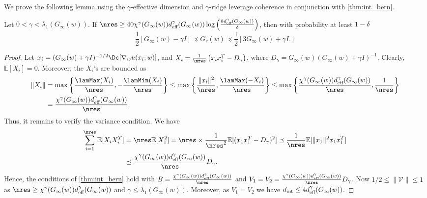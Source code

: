 We prove the following lemma using the $\gamma$-effective dimension and $\gamma$-ridge leverage coherence in conjunction with \cref{thm:int_bern}.
\begin{lemma}
\label{lemma:sampling}
Let $0<\gamma<\lambda_1(G_{\infty}(w))$. 
If $\nres\geq 40\chi^\gamma(G_{\infty}(w))d^{\gamma}_{\textup{eff}}(G_{\infty}(w))\log\left(\frac{8d^{\gamma}_{\textup{eff}}(G_{\infty}(w))}{\delta}\right)$, then with probability at least $1-\delta$
    \[
    \frac{1}{2}\left[G_\infty(w)-\gamma I\right] \preceq G_{r}(w)\preceq \frac{1}{2}\left[3 G_\infty(w)+\gamma I.\right]
    \]
\end{lemma}
\begin{proof}
    Let $x_i = (G_{\infty}(w)+\gamma I)^{-1/2}\Dc[\nabla_w u(x_i;w)]$, and $X_i = \frac{1}{\nres}\left(x_ix_i^{T}-D_\gamma\right)$, where $D_\gamma = G_{\infty}(w)\left(G_{\infty}(w)+\gamma I\right)^{-1}$.
    Clearly, $\mathbb E[X_i] = 0$. 
    Moreover, the $X_i$'s are bounded as
    \begin{align*}
    \|X_i\| & = \max\left\{\frac{\lamMax(X_i)}{\nres},-\frac{\lamMin(X_i)}{\nres}\right\} \leq \max\left\{\frac{\|x_i\|^2}{\nres}, \frac{\lamMax(-X_i)}{\nres}\right\} \leq \max\left\{\frac{\chi^{\gamma}(G_{\infty}(w))d^{\gamma}_{\textup{eff}}(G_{\infty}(w))}{\nres},\frac{1}{\nres}\right\} \\
    & = \frac{\chi^{\gamma}(G_{\infty}(w))d^{\gamma}_{\textup{eff}}(G_{\infty}(w))}{\nres}.
    \end{align*}
    Thus, it remains to verify the variance condition. 
    We have
    \begin{align*}
    \sum^{\nres}_{i=1}\mathbb E[X_iX_i^{T}] & = \nres\mathbb E[X_1^2] = \nres\times \frac{1}{\nres^2}\mathbb E[(x_1x_1^{T}-D_\gamma)^{2}]\preceq \frac{1}{\nres}\mathbb E[\|x_1\|^2 x_1 x_1^{T}] \\ 
    & \preceq \frac{\chi^{\gamma}(G_{\infty}(w))d^{\gamma}_{\textup{eff}}(G_{\infty}(w))}{\nres} D_\gamma. 
    \end{align*}
    Hence, the conditions of \cref{thm:int_bern} hold with $B = \frac{\chi^{\gamma}(G_{\infty}(w))d^{\gamma}_{\textup{eff}}(G_{\infty}(w))}{\nres}$ and $V_1 = V_2 = \frac{\chi^{\gamma}(G_{\infty}(w))d^{\gamma}_{\textup{eff}}(G_{\infty}(w))}{\nres} D_\gamma$.
    Now $1/2 \leq \|\mathcal V\|\leq 1$ as $\nres\geq \chi^{\gamma}(G_{\infty}(w))d^{\gamma}_{\textup{eff}}(G_{\infty}(w))$ and $\gamma\leq \lambda_1\left(G_\infty(w)\right)$.
    Moreover, as $V_1 = V_2$ we have $d_{\textup{int}} \leq 4 d^{\gamma}_{\textup{eff}}(G_{\infty}(w))$. 

\end{proof}
